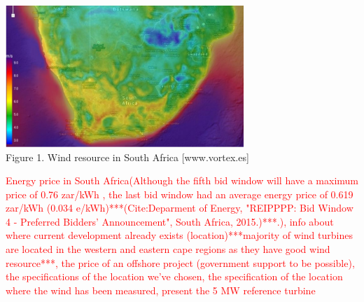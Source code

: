  \begin{center}
\includegraphics[width=9cm]{Images/windafrica.png}\\
Figure 1. Wind resource in South Africa [www.vortex.es]
\end{center}
\textcolor{red}{Energy price in South Africa(Although the fifth bid window will have a maximum price of 0.76 zar/kWh , the last
bid window had an average energy price of 0.619 zar/kWh (0.034 e/kWh)***(Cite:Deparment of Energy, "REIPPPP: Bid Window 4 - Preferred Bidders' Announcement",
South Africa, 2015.)***.), info about where current development already exists (location)***majority of wind turbines are located in the western and eastern cape regions as they have good wind resource***, the price of an offshore project (government support to be possible), the specifications of the location we've chosen, the specification of the location where the wind has been measured, present the 5 MW reference turbine}